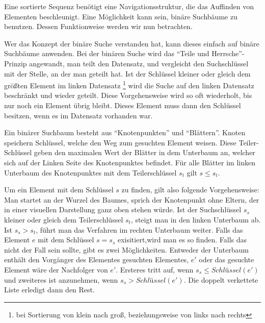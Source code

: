 Eine sortierte Sequenz benötigt eine Navigationsstruktur, die das Auffinden von Elementen beschleunigt. Eine Möglichkeit kann sein, binäre Suchbäume zu benutzen. Dessen Funktionweise werden wir nun betrachten.
\par
Wer das Konzept der binäre Suche verstanden hat, kann dieses einfach auf binäre Suchbäume anwenden. Bei der binären Suche wird das "`Teile und Herrsche"'-Prinzip angewandt, man teilt den Datensatz, und vergleicht den Suchschlüssel mit der Stelle, an der man geteilt hat. Ist der Schlüssel kleiner oder gleich dem größten Element im linken Datensatz \footnote{bei Sortierung von klein nach groß, beziehungsweise von links nach rechts} wird die Suche auf den linken Datensatz beschränkt und wieder geteilt. Diese Vorgehensweise wird so oft wiederholt, bis nur noch ein Element übrig bleibt. Dieses Element muss dann den Schlüssel besitzen, wenn es im Datensatz vorhanden war.
\par
Ein binärer Suchbaum besteht aus "`Knotenpunkten"' und "`Blättern"'. Knoten speichern Schlüssel, welche den Weg zum gesuchten Element weisen. Diese Teiler-Schlüssel geben den maximalen Wert der Blätter in dem Unterbaum an, welcher sich auf der Linken Seite des Knotenpunktes befindet. Für alle Blätter im linken Unterbaum des Knotenpunktes mit dem Teilerschlüssel $s_t$ gilt $s \leq s_t$.
\par
Um ein Element mit dem Schlüssel $s$ zu finden, gilt also folgende Vorgehensweise: Man startet an der Wurzel des Baumes, sprich der Knotenpunkt ohne Eltern, der in einer visuellen Darstellung ganz oben stehen würde. Ist der Suchschlüssel $s_s$ kleiner oder gleich dem Teilerschlüssel $s_t$, steigt man in den linken Unterbaum ab. Ist $s_s>s_t$, führt man das Verfahren im rechten Unterbaum weiter. Falls das Element $e$ mit dem Schlüssel $s=s_s$ exisitiert,wird man es so finden. Falls das nicht der Fall sein sollte, gibt es zwei Möglichkeiten. Entweder der Unterbaum enthält den Vorgänger des Elementes gesuchten Elementes, $e'$ oder das gesuchte Element wäre der Nachfolger von $e'$. Ersteres tritt auf, wenn $s_s \leq Schlüssel(e')$ und zweiteres ist anzunehmen, wenn $s_s>Schlüssel(e')$. \cite{Sanders:19} Die doppelt verkettete Liste erledigt dann den Rest.
\par
